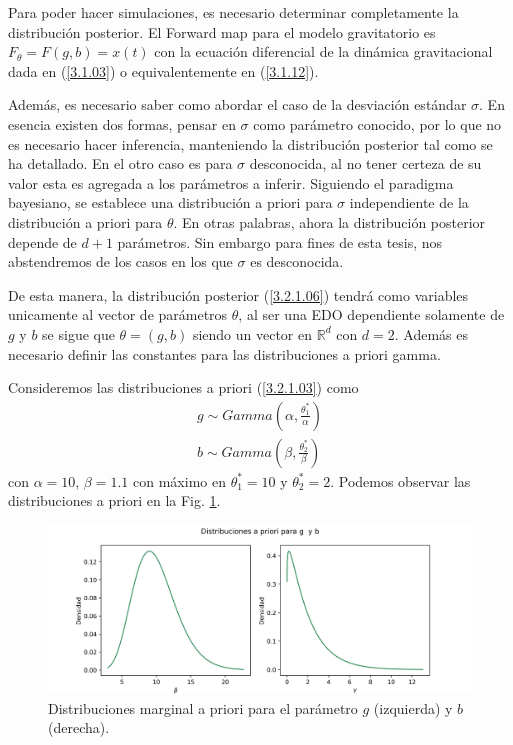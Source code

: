 Para poder hacer simulaciones, es necesario determinar completamente la distribución posterior. El Forward map para el modelo gravitatorio es $F_{\theta} = F(g,b) = x(t)$ con la ecuación diferencial de la dinámica gravitacional dada en (\ref{3.1.03}) o equivalentemente en (\ref{3.1.12}). 

Además, es necesario saber como abordar el caso de la desviación estándar $\sigma$. En esencia existen dos formas, pensar en $\sigma$ como parámetro conocido, por lo que no es necesario hacer inferencia, manteniendo la distribución posterior tal como se ha detallado. En el otro caso es para $\sigma$ desconocida, al no tener certeza de su valor esta es agregada a los parámetros a inferir. Siguiendo el paradigma bayesiano, se establece una distribución a priori para $\sigma$ independiente de la distribución a priori para $\theta$. En otras palabras, ahora la distribución posterior depende de $d+1$ parámetros. Sin embargo para fines de esta tesis, nos abstendremos de los casos en los que $\sigma$ es desconocida.

De esta manera, la distribución posterior (\ref{3.2.1.06}) tendrá como variables unicamente al vector de parámetros $\theta$, al ser una EDO dependiente solamente de $g$ y $b$ se sigue que $\theta = (g,b)$ siendo un vector en $\mathbb{R}^{d}$ con $d = 2$. Además es necesario definir las constantes para las distribuciones a priori gamma.

Consideremos las distribuciones a priori (\ref{3.2.1.03}) como
\begin{align}
    g \sim Gamma \left(\alpha, \frac{\theta_1^{*}}{\alpha}\right) \\
    b \sim Gamma \left(\beta, \frac{\theta_2^{*}}{\beta}\right) 
\end{align}
con $\alpha = 10$, $\beta = 1.1$ con máximo en $\theta_1^{*} = 10$ y $\theta_2^{*} = 2$. Podemos observar las distribuciones a priori en la Fig. \ref{Fig. 3.2.2.01}.

\begin{figure}[H] 
    \centering 
    \includegraphics[width = 15 cm]{img/Exp_Central_gravedad_sigma/Figuras/Generales/Apriori_gravedad_sigma.png}
    \caption{Distribuciones marginal a priori para el parámetro $g$ (izquierda) y $b$ (derecha).}
    \label{Fig. 3.2.2.01}
\end{figure} 

